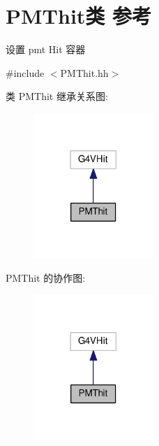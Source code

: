 \hypertarget{classPMThit}{}\section{P\+M\+Thit类 参考}
\label{classPMThit}


设置 pmt Hit 容器  




{\ttfamily \#include $<$P\+M\+Thit.\+hh$>$}



类 P\+M\+Thit 继承关系图\+:\nopagebreak
\begin{figure}[H]
\begin{center}
\leavevmode
\includegraphics[width=129pt]{classPMThit__inherit__graph}
\end{center}
\end{figure}


P\+M\+Thit 的协作图\+:\nopagebreak
\begin{figure}[H]
\begin{center}
\leavevmode
\includegraphics[width=129pt]{classPMThit__coll__graph}
\end{center}
\end{figure}
